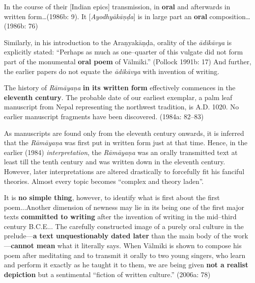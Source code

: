 \begin{myquote}
In the course of their [Indian epics] transmission, in \textbf{oral} and afterwards in written form…(1986b: 9). It [\textit{Ayodhyākāṇḍa}] is in large part an \textbf{oral} composition…(1986b: 76)
\end{myquote}

Similarly, in his introduction to the Araṇyakāṇḍa, orality of the \textit{ādikāvya} is explicitly stated: “Perhaps as much as one–quarter of this vulgate did not form part of the monumental \textbf{oral poem} of Vālmīki.” (Pollock 1991b: 17) And further, the earlier papers do not equate the \textit{ādikāvya} with invention of writing.

\begin{myquote}
The history of \textit{Rāmāyaṇa }\textbf{in its written form} effectively commences in the \textbf{eleventh century}. The probable date of our earliest exemplar, a palm leaf manuscript from Nepal representing the northwest tradition, is A.D. 1020. No earlier manuscript fragments have been discovered. (1984a: 82–83)
\end{myquote}

As manuscripts are found only from the eleventh century onwards, it is inferred that the \textit{Rāmāyaṇa }was first put in written form just at that time. Hence, in the earlier (1984) \textit{interpretation}, the \textit{Rāmāyaṇa }was an orally transmitted text at least till the tenth century and was written down in the eleventh century. However, later interpretations are altered drastically to forcefully fit his fanciful theories. Almost every topic becomes “complex and theory laden”.

\begin{myquote}
It is \textbf{no simple thing}, however, to identify what is ﬁrst about the ﬁrst poem...Another dimension of newness may lie in its being one of the ﬁrst major texts \textbf{committed to writing} after the invention of writing in the mid–third century B.C.E... The carefully constructed image of a purely oral culture in the prelude—\textbf{a text unquestionably dated later} than the main body of the work—\textbf{cannot mean} what it literally says. When Vālmīki is shown to compose his poem after meditating and to transmit it orally to two young singers, who learn and perform it exactly as he taught it to them, we are being given\textbf{ not a realist depiction }but a sentimental “ﬁction of written culture.” (2006a: 78)
\end{myquote}

